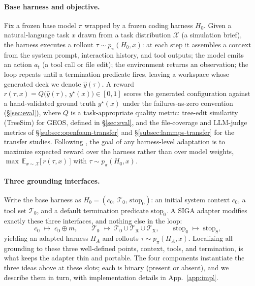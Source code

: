 \documentclass{article}
\begin{document}
\paragraph{Base harness and objective.} Fix a frozen base model $\pi$ wrapped by a frozen coding harness $H_0$. Given a natural-language task $x$ drawn from a task distribution $\mathcal{X}$ (a simulation brief), the harness executes a rollout $\tau \sim p_\pi(H_0, x)$: at each step it assembles a context from the system prompt, interaction history, and tool outputs; the model emits an action $a_t$ (a tool call or file edit); the environment returns an observation; the loop repeats until a termination predicate fires, leaving a workspace whose generated deck we denote $\hat{y}(\tau)$. A reward $r(\tau, x) = Q\big(\hat{y}(\tau),\, y^\star(x)\big) \in [0,1]$ scores the generated configuration against a hand-validated ground truth $y^\star(x)$ under the failures-as-zero convention (\S\ref{sec:eval}), where $Q$ is a task-appropriate quality metric: tree-edit similarity (TreeSim) for GEOS, defined in \S\ref{sec:eval}, and the file-coverage and LLM-judge metrics of \S\ref{subsec:openfoam-transfer} and \S\ref{subsec:lammps-transfer} for the transfer studies. Following \citet{lee2026metaharness}, the goal of any harness-level adaptation is to maximize expected reward over the harness rather than over model weights, $\max\, \mathbb{E}_{x\sim\mathcal{X}}\big[\,r(\tau,x)\,\big]$ with $\tau \sim p_\pi(H_0, x)$.

\paragraph{Three grounding interfaces.} Write the base harness as $H_0 = (c_0,\, \mathcal{T}_0,\, \mathrm{stop}_0)$: an initial system context $c_0$, a tool set $\mathcal{T}_0$, and a default termination predicate $\mathrm{stop}_0$. A SIGA adapter modifies exactly these three interfaces, and nothing else in the loop:
\begin{equation}
c_0 \;\mapsto\; c_0 \oplus m, \qquad
\mathcal{T}_0 \;\mapsto\; \mathcal{T}_0 \cup \mathcal{T}_{\mathrm{R}} \cup \mathcal{T}_{\mathrm{X}}, \qquad
\mathrm{stop}_0 \;\mapsto\; \mathrm{stop}_{\mathrm{S}},
\label{eq:adapter}
\end{equation}
yielding an adapted harness $H_A$ and rollouts $\tau \sim p_\pi(H_A, x)$. Localizing all grounding to these three well-defined points, context, tools, and termination, is what keeps the adapter thin and portable. The four components instantiate the three ideas above at these slots; each is binary (present or absent), and we describe them in turn, with implementation details in App.~\ref{app:impl}.
\end{document}
